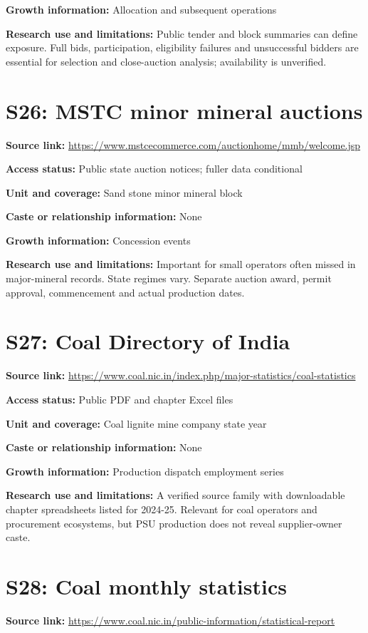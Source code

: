 \documentclass[11pt,a4paper]{report}
\begin{document}
\textbf{Growth information:} Allocation and subsequent operations

\textbf{Research use and limitations:} Public tender and block summaries can define exposure. Full bids, participation, eligibility failures and unsuccessful bidders are essential for selection and close-auction analysis; availability is unverified.

\section{S26: MSTC minor mineral auctions}\hypertarget{S26}{}
\textbf{Source link:} \url{https://www.mstcecommerce.com/auctionhome/mmb/welcome.jsp}

\textbf{Access status:} Public state auction notices; fuller data conditional

\textbf{Unit and coverage:} Sand stone minor mineral block

\textbf{Caste or relationship information:} None

\textbf{Growth information:} Concession events

\textbf{Research use and limitations:} Important for small operators often missed in major-mineral records. State regimes vary. Separate auction award, permit approval, commencement and actual production dates.

\section{S27: Coal Directory of India}\hypertarget{S27}{}
\textbf{Source link:} \url{https://www.coal.nic.in/index.php/major-statistics/coal-statistics}

\textbf{Access status:} Public PDF and chapter Excel files

\textbf{Unit and coverage:} Coal lignite mine company state year

\textbf{Caste or relationship information:} None

\textbf{Growth information:} Production dispatch employment series

\textbf{Research use and limitations:} A verified source family with downloadable chapter spreadsheets listed for 2024-25. Relevant for coal operators and procurement ecosystems, but PSU production does not reveal supplier-owner caste.

\section{S28: Coal monthly statistics}\hypertarget{S28}{}
\textbf{Source link:} \url{https://www.coal.nic.in/public-information/statistical-report}
\end{document}
